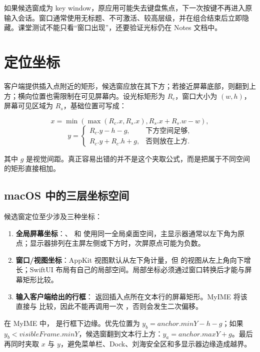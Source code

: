 如果候选窗成为 key window，原应用可能失去键盘焦点，下一次按键不再进入原输入会话。窗口通常使用无标题、不可激活、较高层级，并在组合结束后立即隐藏。课堂测试不能只看“窗口出现”，还要验证光标仍在 Notes 文档中。

\section{定位坐标}

客户端提供插入点附近的矩形，候选窗应放在其下方；若接近屏幕底部，则翻到上方；横向位置也需限制在可见屏幕内。设光标矩形为 \(R_c\)，窗口大小为 \((w,h)\)，屏幕可见区域为 \(R_s\)，基础位置可写成：

\[
x=\min(\max(R_c.x,R_s.x),R_s.x+R_s.w-w),
\]
\[
y=\begin{cases}
R_c.y-h-g, & \text{下方空间足够},\\
R_c.y+R_c.h+g, & \text{否则放在上方}.
\end{cases}
\]

其中 \(g\) 是视觉间距。真正容易出错的并不是这个夹取公式，而是把属于不同空间的矩形直接相加。

\subsection{macOS 中的三层坐标空间}

候选窗定位至少涉及三种坐标：

\begin{enumerate}
  \item \textbf{全局屏幕坐标}：、 和  使用同一全局桌面空间，主显示器通常以左下角为原点；显示器排列在主屏左侧或下方时，次屏原点可能为负数。
  \item \textbf{窗口/视图坐标}：AppKit 视图默认从左下角计量，但  的视图从左上角向下增长；SwiftUI 布局有自己的局部空间。局部坐标必须通过窗口转换后才能与屏幕矩形比较。
  \item \textbf{输入客户端给出的行框}： 返回插入点所在文本行的屏幕矩形。MyIME 将该  直接与  比较，因此不能再调用一次 ，否则会发生二次偏移。
\end{enumerate}


在 MyIME 中， 是行框下边缘。优先位置为 \(y_b=anchor.minY-h-g\)；如果 \(y_b<visibleFrame.minY\)，候选窗翻到文本行上方：\(y_a=anchor.maxY+g\)。最后再同时夹取 \(x\) 与 \(y\)，避免菜单栏、Dock、刘海安全区和多显示器边缘造成越界。

